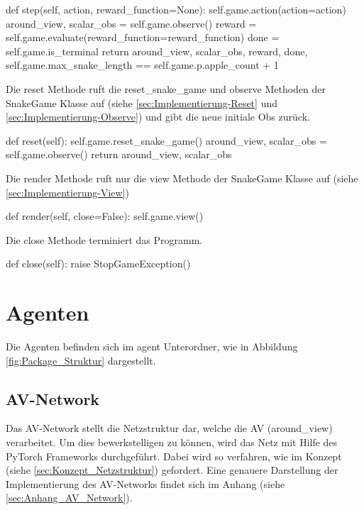 \begin{python}
	def step(self, action, reward_function=None):
		self.game.action(action=action)
		around_view, scalar_obs = self.game.observe()
		reward = self.game.evaluate(reward_function=reward_function)
		done = self.game.is_terminal
		return around_view, scalar_obs, reward, done, 
				   self.game.max_snake_length == self.game.p.apple_count + 1
\end{python}
Die reset Methode ruft die reset\_snake\_game und observe Methoden der SnakeGame Klasse auf (siehe \ref{sec:Implementierung-Reset} und \ref{sec:Implementierung-Observe}) und gibt die neue initiale Obs zurück.
\begin{python}
	def reset(self):
		self.game.reset_snake_game()
		around_view, scalar_obs = self.game.observe()
		return around_view, scalar_obs
\end{python}
Die render Methode ruft nur die view Methode der SnakeGame Klasse auf (siehe \ref{sec:Implementierung-View})
\begin{python}
	def render(self, close=False):
		self.game.view()
\end{python}
Die close Methode terminiert das Programm.
\begin{python}
	def close(self):
		raise StopGameException()
\end{python}

\section{Agenten}
Die Agenten befinden sich im agent Unterordner, wie in Abbildung \ref{fig:Package_Struktur} dargestellt.

\subsection{AV-Network} \label{sec:Implementierung_AV_Network}
Das AV-Network stellt die Netzstruktur dar, welche die AV (around\_view) verarbeitet. Um dies bewerkstelligen zu können, wird das Netz mit Hilfe des PyTorch Frameworks durchgeführt. Dabei wird so verfahren, wie im Konzept (siehe \ref{sec:Konzept_Netzstruktur}) gefordert. Eine genauere Darstellung der Implementierung des AV-Networks findet sich im Anhang (siehe \ref{sec:Anhang_AV_Network}).


